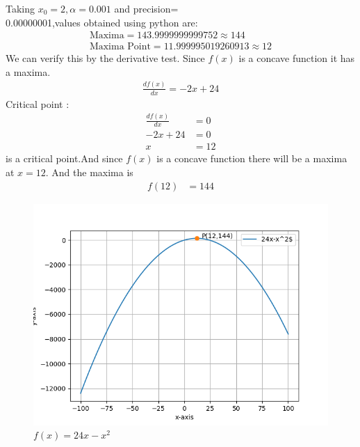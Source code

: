     Taking $x_0=2,\alpha=0.001$ and precision= \\ 0.00000001,values obtained using python are:
    \begin{align}
        \boxed{\text{Maxima} =143.9999999999752 \approx 144 }\\
        \boxed{\text{Maxima Point} =  11.999995019260913\approx 12}
    \end{align}
We can verify this by the derivative test.
Since $f(x)$ is a concave function it has a maxima.
\begin{align}
\frac{df(x)}{dx}=-2x+24
\end{align}
Critical point :
\begin{align}
 \frac{df(x)}{dx}&=0\\
 -2x+24&=0\\
 x&=12
\end{align} 
is a critical point.And since $f(x)$ is a concave function there will be a maxima at $x=12$.
And the maxima is
\begin{align}
f(12)&=144
\end{align}
%
\begin{figure}[!h]
    \centering
    \includegraphics [width=\columnwidth]{solutions/aug/2/4/assignment6.png}
    \caption{$f(x)=24x-x^2$}
    \label{aug/2/4/p(x)}	
\end{figure}
